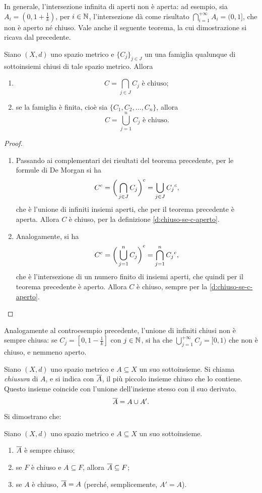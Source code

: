 In generale, l'intersezione infinita di aperti non è aperta: ad esempio, sia $A_i=(0,1+\frac1{k})$, per $i\in\mathbb{N}$, l'intersezione dà come risultato $\bigcap_{i=1}^{+\infty}A_i=(0,1]$, che non è aperto né chiuso.
Vale anche il seguente teorema, la cui dimostrazione si ricava dal precedente.
\begin{teorema} \label{t:unione-intersezione-chiusi}
Siano $(X,d)$ uno spazio metrico e $\{C_j\}_{j\in J}$ un una famiglia qualunque di sottoinsiemi chiusi di tale spazio metrico. Allora
\begin{enumerate}
\item\[
C=\bigcap_{j\in J} C_j\text{ è chiuso};
\]
\item se la famiglia è finita, cioè sia $\{C_1,C_2,\dots,C_n\}$, allora
\[
C=\bigcup_{j=1}^n C_j\text{ è chiuso}.
\]
\end{enumerate}
\end{teorema}
\begin{proof}
\begin{enumerate}
\item Passando ai complementari dei risultati del teorema precedente, per le formule di De Morgan si ha
\[
	{C}^c={\bigg(\bigcap_{j\in J} C_j\bigg)}^c=\bigcup_{j\in J}{C_j}^c,
\]
che è l'unione di infiniti insiemi aperti, che per il teorema precedente è aperta. Allora $C$ è chiuso, per la definizione \ref{d:chiuso-se-c-aperto}.
\item Analogamente, si ha
\[
	{C}^c={\bigg(\bigcup_{j=1}^n C_j\bigg)}^c=\bigcap_{j=1}^n{C_j}^c,
\]
che è l'intersezione di un numero finito di insiemi aperti, che quindi per il teorema precedente è aperto. Allora $C$ è chiuso, sempre per la \ref{d:chiuso-se-c-aperto}.\qedhere
\end{enumerate}
\end{proof}
Analogamente al controesempio precedente, l'unione di infiniti chiusi non è sempre chiusa: se $C_j=[0,1-\frac1{k}]$ con $j\in\mathbb{N}$, si ha che $\bigcup_{j=1}^{+\infty}C_j=[0,1)$ che non è chiuso, e nemmeno aperto.
\begin{definizione}
Siano $(X,d)$ uno spazio metrico e $A\subseteq X$ un suo sottoinsieme. Si chiama \emph{chiusura} di $A$, e si indica con $\overline{A}$, il più piccolo insieme chiuso che lo contiene. Questo insieme coincide con l'unione dell'insieme stesso con il suo derivato.
\[
\overline{A}=A\cup A'.
\]
\end{definizione}
Si dimostrano che:
\begin{teorema}
Siano $(X,d)$ uno spazio metrico e $A\subseteq X$ un suo sottoinsieme. 
\begin{enumerate}
\item $\overline{A}$ è sempre chiuso;
\item se $F$ è chiuso e $A\subseteq F$, allora $\overline{A}\subseteq F$;
\item se $A$ è chiuso, $\overline{A}=A$ (perché, semplicemente, $A'=A$).
\end{enumerate}
\end{teorema}
